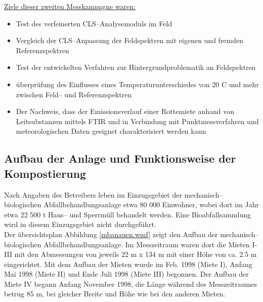\underline{Ziele dieser zweiten Messkampagne waren:}\\

\begin{itemize}
  \item Test des verfeinerten CLS--Analysemoduls im Feld
  \item Vergleich der CLS--Anpassung der Feldspektren mit eigenen
  und fremden Referenzspektren
  \item Test der entwickelten Verfahren zur Hintergrundproblematik
  an Feldspektren
  \item überprüfung des Einflusses eines Temperaturunterschiedes
  von 20 \degree C und mehr zwischen Feld-- und Referenzspektren
  \item Der Nachweis, dass der Emissionsverlauf einer Rottemiete
  anhand von Leitsubstanzen mittels FTIR und in Verbindung mit
  Punktmessverfahren und meteorologischen Daten geeignet
  charakterisiert werden kann
\end{itemize}


\subsection{\label{aufbaumba}Aufbau der Anlage und Funktionsweise der Kompostierung}


Nach Angaben des Betreibers leben im Einzugsgebiet der
mechanisch--biologischen Abfallbehandlungsanlage etwa 80 000
Einwohner, wobei dort im Jahr etwa 22 500 t Haus-- und Sperrmüll
behandelt werden. Eine Bioabfallsammlung wird in diesem
Einzugsgebiet nicht durchgeführt.\\

Der übersichtsplan Abbildung \ref{mbanauen.wmf} zeigt den Aufbau
der mechanisch--biologischen Abfallbehandlungsanlage. Im
Messzeitraum waren dort die Mieten I-III mit den Abmessungen von
jeweils 22 m x 134 m mit einer Höhe von ca. 2.5 m eingerichtet.
Mit dem Aufbau der Mieten wurde im Feb. 1998 (Miete I), Anfang Mai
1998 (Miete II) und Ende Juli 1998 (Miete III) begonnen. Der
Aufbau der Miete IV begann Anfang November 1998, die Länge während
des Messzeitraumes betrug 85 m, bei gleicher Breite und Höhe wie
bei den anderen Mieten.\\

